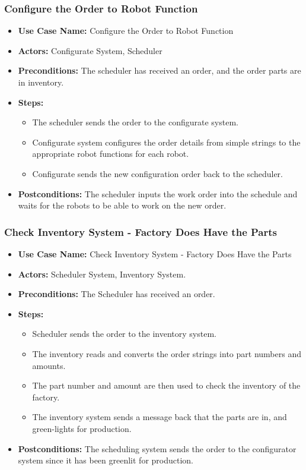 \subsubsection{Configure the Order to Robot Function}
\label{sec:configure-order-to-robot-function}

\begin{itemize}
\item \textbf{Use Case Name:} Configure the Order to Robot Function
\item \textbf{Actors:} Configurate System, Scheduler
\item \textbf{Preconditions:} The scheduler has received an order, and the order parts are in inventory.
\item \textbf{Steps:}
\begin{itemize}[label=--]
\item The scheduler sends the order to the configurate system.
\item Configurate system configures the order details from simple strings to the appropriate robot functions for each robot.
\item Configurate sends the new configuration order back to the scheduler.
\end{itemize}
\item \textbf{Postconditions:} The scheduler inputs the work order into the schedule and waits for the robots to be able to work on the new order.
\end{itemize}
\vspace{1em} 

\subsubsection{Check Inventory System - Factory Does Have the Parts}
\label{sec:check-inventory-has-parts}

\begin{itemize}
\item \textbf{Use Case Name:} Check Inventory System - Factory Does Have the Parts
\item \textbf{Actors:} Scheduler System, Inventory System.
\item \textbf{Preconditions:} The Scheduler has received an order.
\item \textbf{Steps:}
\begin{itemize}[label=--]
\item Scheduler sends the order to the inventory system.
\item The inventory reads and converts the order strings into part numbers and amounts.
\item The part number and amount are then used to check the inventory of the factory.
\item The inventory system sends a message back that the parts are in, and green-lights for production.
\end{itemize}
\item \textbf{Postconditions:} The scheduling system sends the order to the configurator system since it has been greenlit for production.
\end{itemize}
\vspace{1em} 

